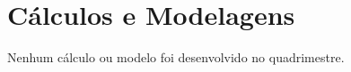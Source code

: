 
\setcounter{secnumdepth}{3}
\section{Cálculos e Modelagens}
\label{calculos_e_modelagens}

Nenhum cálculo ou modelo foi desenvolvido no quadrimestre.

